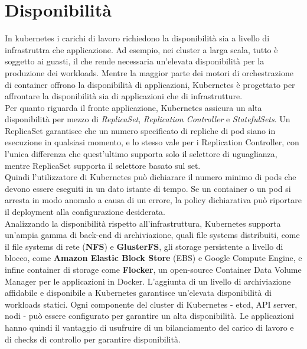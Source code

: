\documentclass[12pt, a4paper]{report}
\begin{document}
\section{Disponibilità}
In kubernetes i carichi di lavoro richiedono la disponibilità sia a livello di infrastruttra che applicazione. Ad esempio, nei cluster a larga scala, tutto è soggetto ai guasti, il che rende necessaria un'elevata disponibilità per la produzione dei workloads.
Mentre la maggior parte dei motori di orchestrazione di container offrono la disponibilità di applicazioni, Kubernetes è progettato per affrontare la disponibilità sia di applicazioni che di infrastrutture.\\
Per quanto riguarda il fronte applicazione, Kubernetes assicura un alta disponibilità per mezzo di \textit{ReplicaSet}, \textit{Replication Controller} e \textit{StatefulSets}. Un ReplicaSet garantisce che un numero specificato di repliche di pod siano in esecuzione in qualsiasi momento, e lo stesso vale per i Replication Controller, con l'unica differenza che quest'ultimo supporta solo il selettore di uguaglianza, mentre ReplicaSet supporta il selettore basato sul set.\\
Quindi l'utilizzatore di Kubernetes può dichiarare il numero minimo di pods che devono essere eseguiti in un dato istante di tempo. Se un container o un pod si arresta in modo anomalo a causa di un errore, la policy dichiarativa può riportare il deployment alla configurazione desiderata.\\
Analizzando la disponibilità rispetto all'infrastruttura, Kubernetes supporta un'ampia gamma di back-end di archiviazione, quali file systems distribuiti, come il file systems di rete (\textbf{NFS}) e \textbf{GlusterFS}, gli storage persistente a livello di blocco, come \textbf{Amazon Elastic Block Store} (EBS) e Google Compute Engine, e infine container di storage come \textbf{Flocker}, un open-source Container Data Volume Manager per le applicazioni in Docker. L'aggiunta di un livello di archiviazione affidabile e disponibile a Kubernetes garantisce un'elevata disponibilità di workloads statici. Ogni componente del cluster di Kubernetes - etcd, API server, nodi - può essere configurato per garantire un alta disponibilità. Le applicazioni hanno quindi il vantaggio di usufruire di un bilanciamento del carico di lavoro e di checks di controllo per garantire disponibilità.
\end{document}
